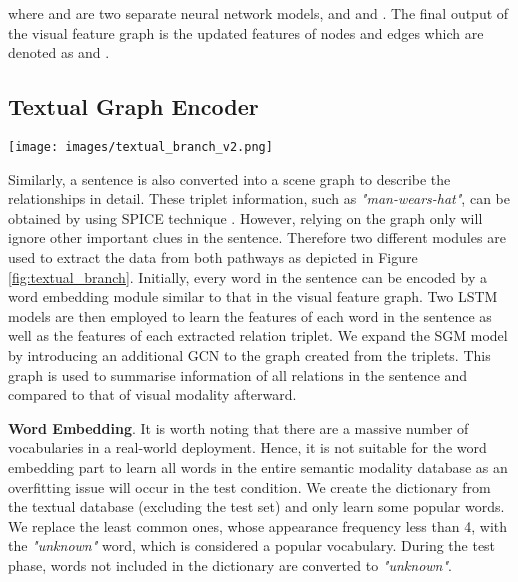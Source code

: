 \documentclass{IOS-Book-Article}
\begin{document}
where  and  are two separate neural network models, and  and . The final output of the visual feature graph is the updated features of nodes and edges which are denoted as  and .

\subsection{Textual Graph Encoder}
\begin{figure*}[h]
  \centering
  \texttt{[image: images/textual\_branch\_v2.png]}
  \caption{This figure presents the workflow of a sentence in our proposed model. Both scene graphs and each word in the sentence go through a word embedding to learn the semantic features. Two distinct LSTM models are applied to the sentence and the triplet relations in the graph to get the word and the relation features used to compare with the visual feature scene graph to get the local similarity. Each encoded node and edge in the graph after the LSTM model then form into a graph with will be fed into a graph convolutional network to update their features and create the textual feature graph. Finally, this graph is embedded into a vector compared with that of visual data to measure the global similarity score. The  and  in the figure indicate the number of words and number of relations in the sentence.}
  \label{fig:textual_branch}
\end{figure*}

Similarly, a sentence is also converted into a scene graph to describe the relationships in detail. These triplet information, such as \textit{"man-wears-hat"}, can be obtained by using SPICE technique \cite{anderson2016spice}. However, relying on the graph only will ignore other important clues in the sentence. Therefore two different modules are used to extract the data from both pathways as depicted in Figure \ref{fig:textual_branch}. Initially, every word in the sentence can be encoded by a word embedding module similar to that in the visual feature graph. Two LSTM models \cite{hochreiter1997long} are then employed to learn the features of each word in the sentence as well as the features of each extracted relation triplet. We expand the SGM model by introducing an additional GCN to the graph created from the triplets. This graph is used to summarise information of all relations in the sentence and compared to that of visual modality afterward.

\textbf{Word Embedding}. It is worth noting that there are a massive number of vocabularies in a real-world deployment. Hence, it is not suitable for the word embedding part to learn all words in the entire semantic modality database as an overfitting issue will occur in the test condition. We create the dictionary from the textual database (excluding the test set) and only learn some popular words. We replace the least common ones, whose appearance frequency less than 4, with the \textit{"unknown"} word, which is considered a popular vocabulary. During the test phase, words not included in the dictionary are converted to \textit{"unknown"}.
\end{document}
